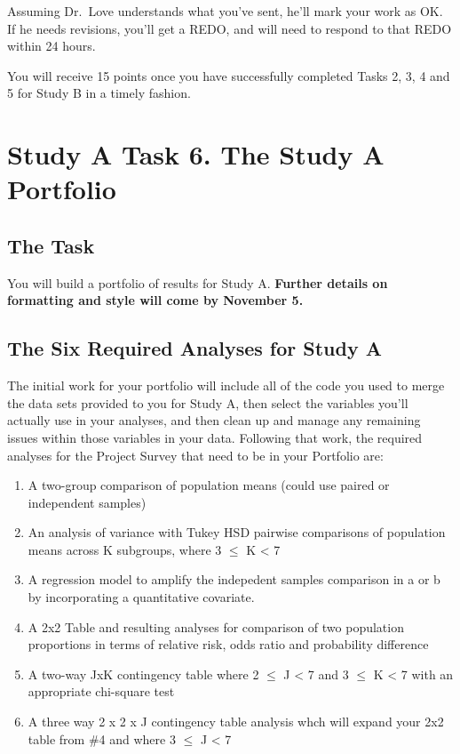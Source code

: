 \documentclass[]{book}
\providecommand{\tightlist}{%
  \setlength{\itemsep}{0pt}\setlength{\parskip}{0pt}}
\begin{document}
Assuming Dr.~Love understands what you've sent, he'll mark your work as OK. If he needs revisions, you'll get a REDO, and will need to respond to that REDO within 24 hours.

You will receive 15 points once you have successfully completed Tasks 2, 3, 4 and 5 for Study B in a timely fashion.

\hypertarget{task6a}{%
\chapter{Study A Task 6. The Study A Portfolio}\label{task6a}}

\hypertarget{the-task-6}{%
\section{The Task}\label{the-task-6}}

You will build a portfolio of results for Study A. \textbf{Further details on formatting and style will come by November 5.}

\hypertarget{the-six-required-analyses-for-study-a-1}{%
\section{The Six Required Analyses for Study A}\label{the-six-required-analyses-for-study-a-1}}

The initial work for your portfolio will include all of the code you used to merge the data sets provided to you for Study A, then select the variables you'll actually use in your analyses, and then clean up and manage any remaining issues within those variables in your data. Following that work, the required analyses for the Project Survey that need to be in your Portfolio are:

\begin{enumerate}
\def\labelenumi{\arabic{enumi}.}
\tightlist
\item
  A two-group comparison of population means (could use paired or independent samples)
\item
  An analysis of variance with Tukey HSD pairwise comparisons of population means across K subgroups, where 3 \(\leq\) K \textless{} 7
\item
  A regression model to amplify the indepedent samples comparison in a or b by incorporating a quantitative covariate.
\item
  A 2x2 Table and resulting analyses for comparison of two population proportions in terms of relative risk, odds ratio and probability difference
\item
  A two-way JxK contingency table where 2 \(\leq\) J \textless{} 7 and 3 \(\leq\) K \textless{} 7 with an appropriate chi-square test
\item
  A three way 2 x 2 x J contingency table analysis whch will expand your 2x2 table from \#4 and where 3 \(\leq\) J \textless{} 7
\end{enumerate}
\end{document}
